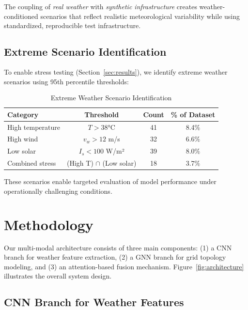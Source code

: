 \documentclass[journal,12pt,onecolumn]{IEEEtran}
\begin{document}
The coupling of \textit{real weather} with \textit{synthetic infrastructure} creates weather-conditioned scenarios that reflect realistic meteorological variability while using standardized, reproducible test infrastructure.

\subsection{Extreme Scenario Identification}

To enable stress testing (Section~\ref{sec:results}), we identify extreme weather scenarios using 95th percentile thresholds:

\begin{table}[htbp]
\caption{Extreme Weather Scenario Identification}
\label{tab:extreme_scenarios}
\centering
\begin{tabular}{lccc}
\toprule
\textbf{Category} & \textbf{Threshold} & \textbf{Count} & \textbf{\% of Dataset} \\
\midrule
High temperature & $T > 38$°C & 41 & 8.4\% \\
High wind & $v_w > 12$ m/s & 32 & 6.6\% \\
Low solar & $I_s < 100$ W/m² & 39 & 8.0\% \\
Combined stress & (High T) $\cap$ (Low solar) & 18 & 3.7\% \\
\bottomrule
\end{tabular}
\end{table}

These scenarios enable targeted evaluation of model performance under operationally challenging conditions.

\section{Methodology}
\label{sec:methodology}

Our multi-modal architecture consists of three main components: (1) a CNN branch for weather feature extraction, (2) a GNN branch for grid topology modeling, and (3) an attention-based fusion mechanism. Figure~\ref{fig:architecture} illustrates the overall system design.

\subsection{CNN Branch for Weather Features}
\end{document}
